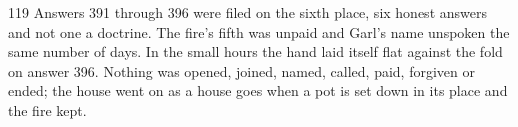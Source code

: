 \begin{CRchronicle}{119}
Answers 391 through 396 were filed on the sixth place, six honest answers and not one a doctrine. The fire’s fifth was unpaid and Garl’s name unspoken the same number of days. In the small hours the hand laid itself flat against the fold on answer 396. Nothing was opened, joined, named, called, paid, forgiven or ended; the house went on as a house goes when a pot is set down in its place and the fire kept.
\end{CRchronicle}
